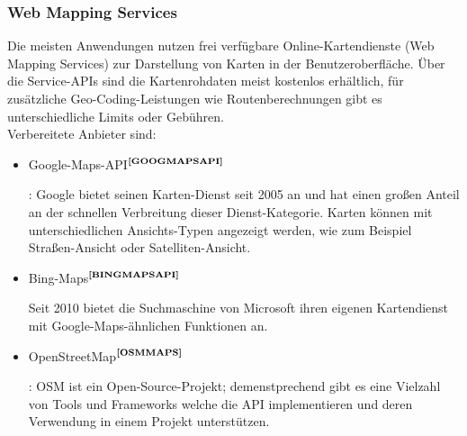 \subsubsection{Web Mapping Services}
Die meisten Anwendungen nutzen frei verfügbare Online-Kartendienste (Web Mapping Services) zur Darstellung von Karten in der Benutzeroberfläche. Über die Service-APIs sind die Kartenrohdaten meist kostenlos erhältlich, für zusätzliche Geo-Coding-Leistungen wie Routenberechnungen gibt es unterschiedliche Limits oder Gebühren.\\
Verbereitete Anbieter sind:
\begin{itemize}
  \item Google-Maps-API$^{\textbf{\ref{GOOGMAPSAPI}}}$
\addtocounter{footnote}{1}
:
Google bietet seinen Karten-Dienst seit 2005 an und hat einen großen Anteil an der schnellen Verbreitung
dieser Dienst-Kategorie. Karten können mit unterschiedlichen Ansichts-Typen angezeigt werden, wie zum Beispiel Straßen-Ansicht oder Satelliten-Ansicht.
  \item Bing-Maps$^{\textbf{\ref{BINGMAPSAPI}}}$
\addtocounter{footnote}{1}
Seit 2010 bietet die Suchmaschine von Microsoft ihren eigenen Kartendienst mit Google-Maps-ähnlichen Funktionen an.
  \item OpenStreetMap$^{\textbf{\ref{OSMMAPS}}}$
\addtocounter{footnote}{1}
:
OSM ist ein Open-Source-Projekt; demenstprechend gibt es eine Vielzahl von Tools und Frameworks welche die API implementieren und deren Verwendung in einem Projekt unterstützen.
\end{itemize}

